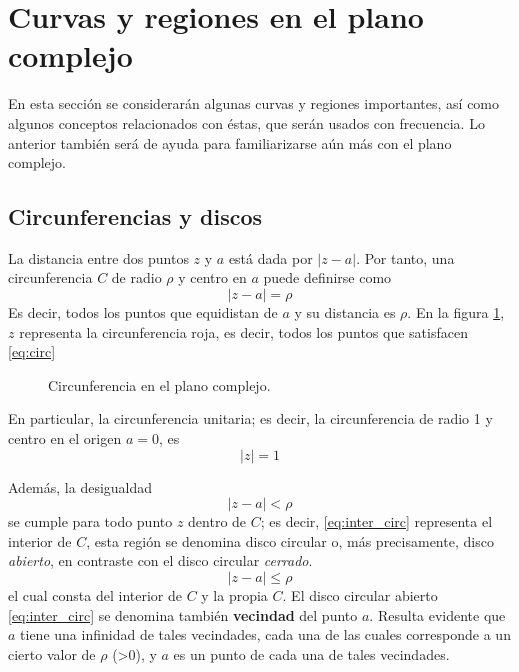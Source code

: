 \section{Curvas y regiones en el plano complejo}
\label{sec:1_curvas_y_regiones_en_el_plano_complejo}

En esta sección se considerarán algunas curvas y regiones importantes, así como algunos conceptos relacionados con éstas, que serán usados con frecuencia. Lo anterior también será de ayuda para familiarizarse aún más con el plano complejo.

\subsection{Circunferencias y discos}

La distancia entre dos puntos $z$ y $a$ está dada por $\lvert z-a \rvert$. Por tanto, una circunferencia $C$ de radio $\rho$ y centro en $a$ puede definirse como
\begin{equation}
  \lvert z-a \rvert = \rho
  \label{eq:circ}
\end{equation}
Es decir, todos los puntos que equidistan de $a$ y su distancia es $\rho$. En la figura \ref{fig:circ_compx}, $z$ representa la circunferencia roja, es decir, todos los puntos que satisfacen \ref{eq:circ}
\begin{figure}[ht]
  \centering
  \caption{Circunferencia en el plano complejo.}
  \label{fig:circ_compx}
\end{figure}

En particular, la circunferencia unitaria; es decir, la circunferencia de radio 1 y centro en el origen $a=0$, es
\begin{equation*}
  \lvert z \rvert = 1
\end{equation*}

Además, la desigualdad
\begin{equation}
  \lvert z - a \rvert < \rho
  \label{eq:inter_circ}
\end{equation}
se cumple para todo punto $z$ dentro de $C$; es decir, \ref{eq:inter_circ} representa el interior de $C$, esta región se denomina disco circular o, más precisamente, disco \textit{abierto}, en contraste con el disco circular \textit{cerrado}.
\begin{equation*}
  \lvert z-a \rvert \leqslant \rho
\end{equation*}
el cual consta del interior de $C$ y la propia $C$. El disco circular abierto \ref{eq:inter_circ} se denomina también \textbf{vecindad} del punto $a$. Resulta evidente que $a$ tiene una infinidad de tales vecindades, cada una de las cuales corresponde a un cierto valor de $\rho$ (>0), y $a$ es un punto de cada una de tales vecindades.
\label{word:vecindad}

